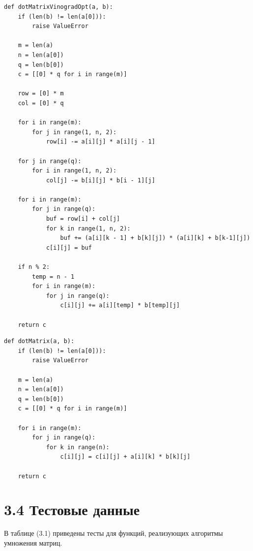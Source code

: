 \documentclass[12pt, a4paper]{report}
\begin{document}
\newpage
\begin{lstlisting}[title=Листинг 3.2~--- Оптимизированный алгоритм Копперсмита--Винограда]
def dotMatrixVinogradOpt(a, b):
	if (len(b) != len(a[0])):
		raise ValueError

	m = len(a)
	n = len(a[0])
	q = len(b[0])
	c = [[0] * q for i in range(m)]

	row = [0] * m
	col = [0] * q

	for i in range(m):
		for j in range(1, n, 2):
			row[i] -= a[i][j] * a[i][j - 1]

	for j in range(q):
		for i in range(1, n, 2):
			col[j] -= b[i][j] * b[i - 1][j]

	for i in range(m):
		for j in range(q):
			buf = row[i] + col[j]
			for k in range(1, n, 2):
				buf += (a[i][k - 1] + b[k][j]) * (a[i][k] + b[k-1][j])
			c[i][j] = buf

	if n % 2:
		temp = n - 1
		for i in range(m):
			for j in range(q):
				c[i][j] += a[i][temp] * b[temp][j]

	return c
\end{lstlisting}

\newpage
\begin{lstlisting}[title=Листинг 3.3~--- Стандартный алгоритм умножения матриц]
def dotMatrix(a, b):
	if (len(b) != len(a[0])):
		raise ValueError

	m = len(a)
	n = len(a[0])
	q = len(b[0])
	c = [[0] * q for i in range(m)]

	for i in range(m):
		for j in range(q):
			for k in range(n):
				c[i][j] = c[i][j] + a[i][k] * b[k][j]

	return c
\end{lstlisting}

\section*{3.4 Тестовые данные}

В таблице (3.1) приведены тесты для функций, реализующих алгоритмы умножения матриц.
\end{document}
